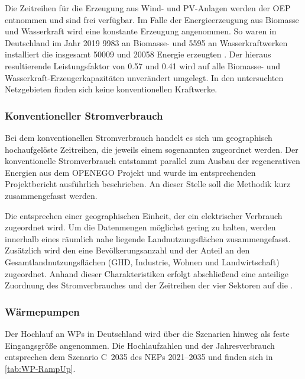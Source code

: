 

Die Zeitreihen für die Erzeugung aus Wind- und \gls{PV}-Anlagen werden der \gls{OEP} \cite{OEP} entnommen und sind frei verfügbar.
Im Falle der Energieerzeugung aus Biomasse und Wasserkraft wird eine konstante Erzeugung angenommen.
So waren in Deutschland im Jahr \num{2019} \SI{9983}{\mw} an Biomasse- und \SI{5595}{\mw} an Wasserkraftwerken installiert die insgesamt \SI{50009}{\gwh} und \SI{20058}{\gwh} Energie erzeugten \cite{BMWi2020}.
Der hieraus resultierende Leistungsfaktor von \num{0.57} und \num{0.41} wird auf alle Biomasse- und Wasserkraft-Erzeugerkapazitäten unverändert umgelegt.
In den untersuchten Netzgebieten finden sich keine konventionellen Kraftwerke.


\subsubsection{Konventioneller Stromverbrauch}

Bei dem konventionellen Stromverbrauch handelt es sich um geographisch hochaufgelöste Zeitreihen, die jeweils einem sogenannten \Lastgebiet zugeordnet werden.
Der konventionelle Stromverbrauch entstammt parallel zum Ausbau der regenerativen Energien aus dem \gls{OPENEGO} Projekt und wurde im entsprechenden Projektbericht \cite{Mueller2019} ausführlich beschrieben.
An dieser Stelle soll die Methodik kurz zusammengefasst werden.\medskip

Die \Lastgebiete entsprechen einer geographischen Einheit, der ein elektrischer Verbrauch zugeordnet wird.
Um die Datenmengen möglichst gering zu halten, werden innerhalb eines \Lastgebietes räumlich nahe liegende Landnutzungsflächen zusammengefasst.
Zusätzlich wird den \Lastgebieten eine Bevölkerungsanzahl und der Anteil an den Gesamtlandnutzungsflächen (\gls{GHD}, Industrie, Wohnen und Landwirtschaft) zugeordnet.
Anhand dieser Charakteristiken erfolgt abschließend eine anteilige Zuordnung des Stromverbrauches und der Zeitreihen der vier Sektoren auf die \Lastgebietedot.


\subsubsection{Wärmepumpen}

Der Hochlauf an \glspl{WP} in Deutschland wird über die Szenarien hinweg als feste Eingangsgröße angenommen.
Die Hochlaufzahlen und der Jahresverbrauch entsprechen dem Szenario C~\num{2035} des \glspl{NEP} \numrange[range-phrase=~{--}~]{2021}{2035} \cite{BNetzA2020} und finden sich in \autoref{tab:WP-RampUp}.

